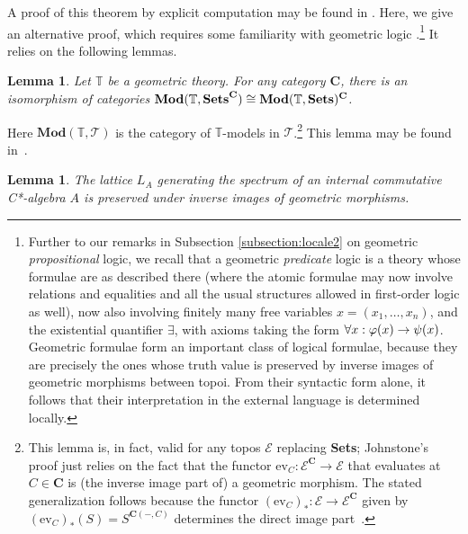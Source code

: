 \documentclass[11pt]{article}
\newcommand{\Sets}{\mbox{\textbf{Sets}}}
\newcommand{\raw}{\rightarrow} \newcommand{\rat}{\mapsto}
\newcommand{\CT}{{\mathcal T}} \newcommand{\CV}{{\mathcal V}}
\newcommand{\cat}[1]{\ensuremath{\mathbf{#1}}}
\newcommand{\Cat}[1]{\ensuremath{\mathrm{\textbf{#1}}}}
\newtheorem{lemma}[theorem]{Lemma}
\begin{document}
A proof of this theorem by explicit computation may be found in \cite[Thm.\ 5.2.3]{caspers}. Here, we give an alternative proof, which
requires some familiarity with geometric logic
\cite{maclanemoerdijk92,johnstone02b,Vic:LocTopSp}.\footnote{Further to our
remarks in Subsection \ref{subsection:locale2}
on geometric {\it propositional} logic, we recall that a geometric
{\it predicate} logic is a theory whose formulae are as described there (where the atomic
formulae may now involve relations and equalities and all the usual structures
allowed in first-order logic as well),
 now also involving finitely many free variables $x=(x_1,\ldots, x_n)$, and the existential quantifier $\exists$, 
with
axioms taking the form $\forall x: \phv(x)\raw\ps(x)$. 
Geometric formulae form
an important class of logical formulae, because they are precisely the ones
whose truth value is preserved by inverse images of geometric morphisms
between topoi. From their syntactic form alone, it follows that their
interpretation
in the external language is determined locally.} It
 relies on the following lemmas.
\begin{lemma}
\label{prop:geometricformulae}
  Let  $\mathbb{T}$ be a geometric theory. For 
  any category   $\cat{C}$, there is an
  isomorphism of categories $\Cat{Mod}(\mathbb{T},\Sets^{\cat{C}}) \cong
  \Cat{Mod}(\mathbb{T},\Sets)^{\cat{C}}$.
\end{lemma}
  Here $\Cat{Mod}(\mathbb{T},\CT)$ is the category of
  $\mathbb{T}$-models in $\CT$.\footnote{This lemma is, in fact, valid for any topos $\mathcal{E}$ replacing \Sets; Johnstone's proof just relies on the
fact that the functor
  $\mathrm{ev}_C : \mathcal{E}^{\cat{C}} \to \mathcal{E}$ that evaluates at
  $C \in \cat{C}$ is (the inverse image part of) a geometric
  morphism. The stated generalization follows because the
  functor $(\mathrm{ev}_C)_* : \mathcal{E} \to \mathcal{E}^{\cat{C}}$ given by
  $(\mathrm{ev}_C)_*(S) = S^{\cat{C}(-,C)}$ determines the direct
  image part~\cite[Exercise~VII.10.1]{maclanemoerdijk92}.}
  This lemma may be found in~\cite[Corollary
  D.1.2.14]{johnstone02b}.
\begin{lemma}\label{invlemma}
The  lattice $L_A$  generating the
spectrum of an internal commutative C*-algebra $A$ is preserved under inverse
images of geometric
morphisms.
 \end{lemma}
\end{document}
